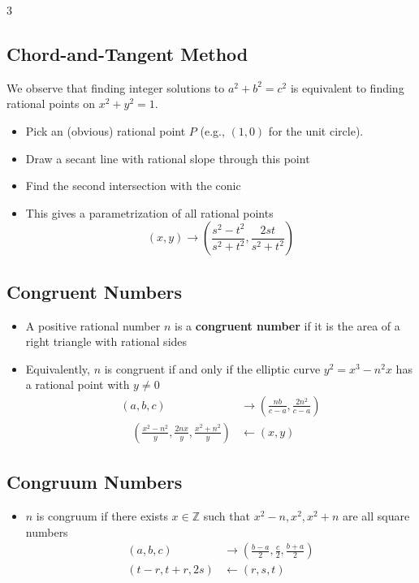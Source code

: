 \documentclass[8,a4paper]{article}
\begin{document}
\begin{multicols}{3}
	\subsection{Chord-and-Tangent Method}
	We observe that finding integer solutions to $a^2 + b^2 = c^2$ is equivalent to finding rational points on $x^2 + y^2 = 1$.
	\begin{itemize}[leftmargin=*]
		\item Pick an (obvious) rational point $P$ (e.g., $(1,0)$ for the unit circle).
		\item Draw a secant line with rational slope through this point
		\item Find the second intersection with the conic
		\item This gives a parametrization of all rational points
		      \[(x, y) \rightarrow \left(\frac{s^2 - t^2}{s^2 + t^2}, \frac{2st}{s^2 + t^2}\right)\]
	\end{itemize}

	\subsection{Congruent Numbers}
	\begin{itemize}[leftmargin=*]
		\item A positive rational number $n$ is a \textbf{congruent number} if it is the area of a right triangle with rational sides
		\item Equivalently, $n$ is congruent if and only if the elliptic curve $y^2 = x^3 - n^2x$ has a rational point with $y \neq 0$
		      \begin{align*}
			      (a, b, c) & \rightarrow (\frac{nb}{c-a}, \frac{2n^2}{c-a}) \\ \quad (\frac{x^2-n^2}{y}, \frac{2nx}{y}, \frac{x^2+n^2}{y}) &\leftarrow (x,y)
		      \end{align*}
	\end{itemize}

	\subsection{Congruum Numbers}
	\begin{itemize}[leftmargin=*]
		\item $n$ is congruum if there exists $x\in\mathbb{Z}$ such that $x^2 - n, x^2, x^2 + n$ are all square numbers
		      \begin{align*}
			      (a, b, c)      & \rightarrow (\frac{b-a}{2}, \frac{c}{2}, \frac{b + a}{2}) \\
			      (t-r, t+r, 2s) & \leftarrow (r, s, t)
		      \end{align*}
	\end{itemize}


\end{multicols}
\end{document}
